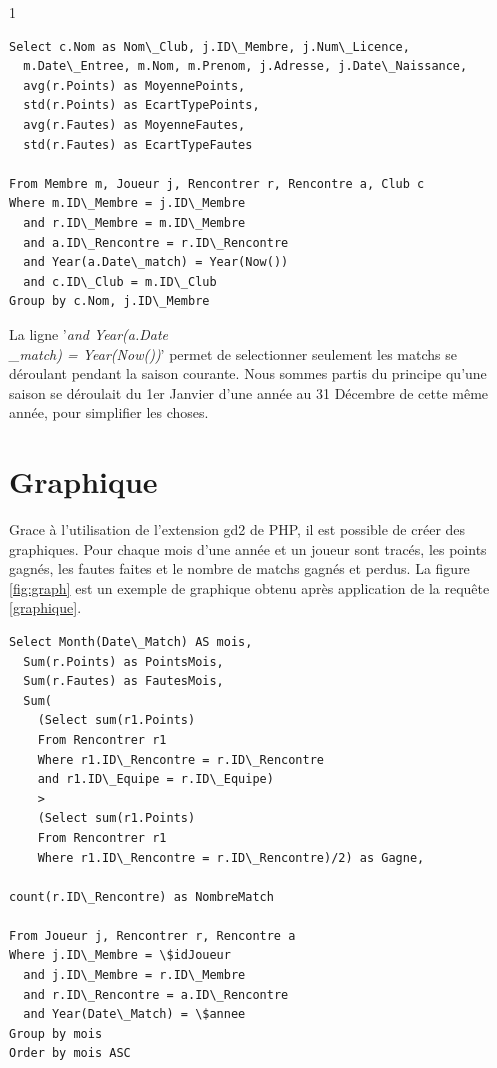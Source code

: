 1\documentclass[a4paper»,8pt,french,fleqn]{report}
\begin{document}
\begin{lstlisting}
Select c.Nom as Nom\_Club, j.ID\_Membre, j.Num\_Licence, 
  m.Date\_Entree, m.Nom, m.Prenom, j.Adresse, j.Date\_Naissance,
  avg(r.Points) as MoyennePoints,
  std(r.Points) as EcartTypePoints,
  avg(r.Fautes) as MoyenneFautes,
  std(r.Fautes) as EcartTypeFautes

From Membre m, Joueur j, Rencontrer r, Rencontre a, Club c
Where m.ID\_Membre = j.ID\_Membre
  and r.ID\_Membre = m.ID\_Membre
  and a.ID\_Rencontre = r.ID\_Rencontre
  and Year(a.Date\_match) = Year(Now())
  and c.ID\_Club = m.ID\_Club
Group by c.Nom, j.ID\_Membre
\end{lstlisting}

La ligne '\textit{and Year(a.Date\\_match) = Year(Now())}' permet de selectionner seulement les matchs se déroulant pendant la saison courante. Nous sommes partis du principe qu'une saison se déroulait du 1er Janvier d'une année au 31 Décembre de cette même année, pour simplifier les choses.


\section{Graphique}
Grace à l'utilisation de l'extension gd2 de PHP, il est possible de créer des graphiques. Pour chaque mois d'une année et un joueur sont tracés, les points gagnés, les fautes faites et le nombre de matchs gagnés et perdus. La figure \ref{fig:graph} est un exemple de graphique obtenu après application de la requête \ref{graphique}.

\begin{lstlisting}
Select Month(Date\_Match) AS mois,
  Sum(r.Points) as PointsMois,
  Sum(r.Fautes) as FautesMois,
  Sum(
    (Select sum(r1.Points)
    From Rencontrer r1
    Where r1.ID\_Rencontre = r.ID\_Rencontre
    and r1.ID\_Equipe = r.ID\_Equipe)
    >
    (Select sum(r1.Points)
    From Rencontrer r1
    Where r1.ID\_Rencontre = r.ID\_Rencontre)/2) as Gagne,
    
count(r.ID\_Rencontre) as NombreMatch

From Joueur j, Rencontrer r, Rencontre a
Where j.ID\_Membre = \$idJoueur
  and j.ID\_Membre = r.ID\_Membre
  and r.ID\_Rencontre = a.ID\_Rencontre
  and Year(Date\_Match) = \$annee
Group by mois 
Order by mois ASC
\end{lstlisting}
\end{document}
